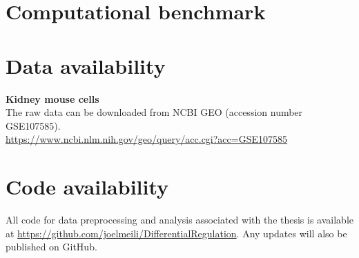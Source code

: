 \section{Computational benchmark}

\section{Data availability}

\noindent\textbf{Kidney mouse cells} \\
The raw data can be downloaded from NCBI GEO (accession number GSE107585). \\ 
\url{https://www.ncbi.nlm.nih.gov/geo/query/acc.cgi?acc=GSE107585} \\

\section{Code availability}
All code for data preprocessing and analysis associated with the thesis is available at \url{https://github.com/joelmeili/DifferentialRegulation}. Any updates will also be published on GitHub.

